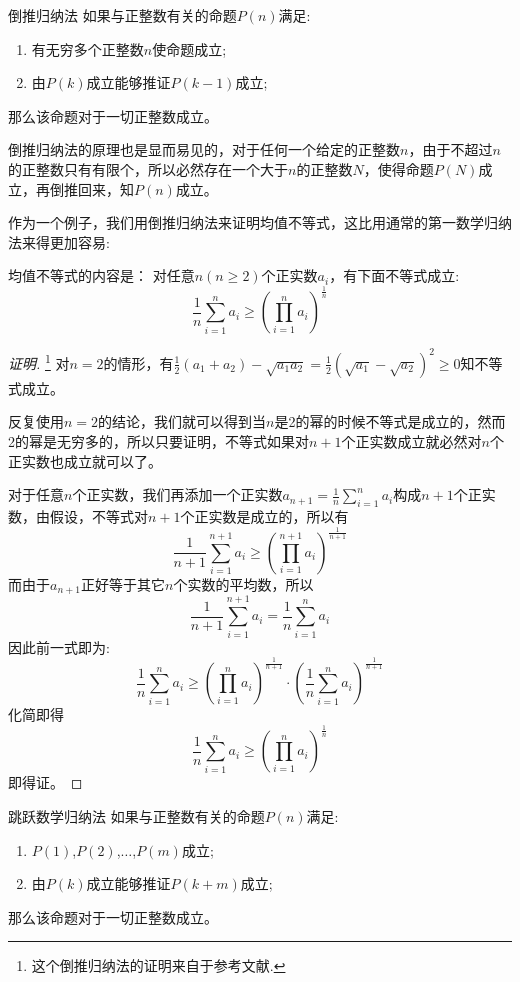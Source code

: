 \begin{myprinciple}{倒推归纳法}{}{\label{thm:mathematical-induction-3}}
  如果与正整数有关的命题$P(n)$满足:
  \begin{enumerate}
  \item 有无穷多个正整数$n$使命题成立;
  \item 由$P(k)$成立能够推证$P(k-1)$成立;
  \end{enumerate}
  那么该命题对于一切正整数成立。
\end{myprinciple}
倒推归纳法的原理也是显而易见的，对于任何一个给定的正整数$n$，由于不超过$n$的正整数只有有限个，所以必然存在一个大于$n$的正整数$N$，使得命题$P(N)$成立，再倒推回来，知$P(n)$成立。

\begin{example}[均值不等式]
作为一个例子，我们用倒推归纳法来证明均值不等式，这比用通常的第一数学归纳法来得更加容易:

  均值不等式的内容是： 对任意$n(n\geqslant2)$个正实数$a_i$，有下面不等式成立:
\[ \frac{1}{n}\sum_{i=1}^na_i \geqslant \left( \prod_{i=1}^na_i \right)^{\frac{1}{n}} \]

\begin{proof}[证明]\footnote{这个倒推归纳法的证明来自于参考文献\cite{the-secret-of-inequality}.}
  对$n=2$的情形，有$\frac{1}{2}(a_1+a_2)-\sqrt{a_1a_2}=\frac{1}{2}(\sqrt{a_1}-\sqrt{a_2})^2\geqslant 0$知不等式成立。

 反复使用$n=2$的结论，我们就可以得到当$n$是2的幂的时候不等式是成立的，然而2的幂是无穷多的，所以只要证明，不等式如果对$n+1$个正实数成立就必然对$n$个正实数也成立就可以了。

对于任意$n$个正实数，我们再添加一个正实数$a_{n+1}=\frac{1}{n}\sum_{i=1}^na_i$构成$n+1$个正实数，由假设，不等式对$n+1$个正实数是成立的，所以有
\[
\frac{1}{n+1}\sum_{i=1}^{n+1}a_i \geqslant \left( \prod_{i=1}^{n+1}a_i \right)^{\frac{1}{n+1}}
\]
而由于$a_{n+1}$正好等于其它$n$个实数的平均数，所以
\[ \frac{1}{n+1}\sum_{i=1}^{n+1}a_i = \frac{1}{n}\sum_{i=1}^{n}a_i \]
因此前一式即为:
\[
\frac{1}{n}\sum_{i=1}^{n}a_i \geqslant \left( \prod_{i=1}^{n}a_i \right)^{\frac{1}{n+1}} \cdot \left( \frac{1}{n}\sum_{i=1}^na_i \right)^{\frac{1}{n+1}}
\]
化简即得
\[
\frac{1}{n}\sum_{i=1}^na_i \geqslant \left( \prod_{i=1}^na_i \right)^{\frac{1}{n}} 
\]
即得证。
\end{proof}
\end{example}

\begin{myprinciple}{跳跃数学归纳法}{}{}
  如果与正整数有关的命题$P(n)$满足:
  \begin{enumerate}
  \item $P(1)$,$P(2)$,$\ldots$,$P(m)$成立;
  \item 由$P(k)$成立能够推证$P(k+m)$成立;
  \end{enumerate}
那么该命题对于一切正整数成立。
\end{myprinciple}

